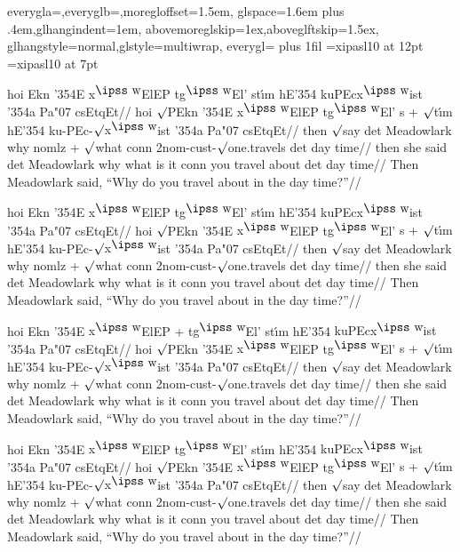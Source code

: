 
%
   {everygla=\ips,everyglb=\ips,moregloffset=1.5em,
   glspace=1.6em plus .4em,glhangindent=1em,
   abovemoreglskip=1ex,aboveglftskip=1.5ex,
   glhangstyle=normal,glstyle=multiwrap,
   everygl={\rightskip=0pt plus 1fil}}
\font\ips=xipasl10 at 12pt
\font\ipss=xipasl10 at 7pt
\def\mroot{$\surd$}
\def\L{\char'354}
\def\v#1{{\accent"07 #1}}
\def\C{{\accent"07 c}}
\def\W{$^{\hbox{\ipss w}}\mskip-2mu$}

\hsize=4in

\framedisplay
\ex[lingstyle=ips-gloss]
\begingl
\gla hoi Ekn {\L}E {x\W}ElEP t{g\W}El' st{\'\i}m
   {hE\L} {kuPEcx\W ist} {\L a} Pa{\v c}sEtqEt//
\glb hoi {\mroot}PEkn {\L}E {x\W}ElEP t{g\W}El' {s + \mroot t\'\i m}
   {hE\L} ku-PEc-\mroot{x\W}ist {\L}a Pa{\v c}sEtqEt//
\glc then {\mroot}say det Meadowlark why
      {nomlz + \mroot what} conn
   2nom-cust-{\mroot}one.travels det {day time}//
\glc then {she said} det Meadowlark why {what is it}
   conn {you travel about} det {day time}//
\glft Then Meadowlark said, ``Why do you travel about in the day
time?''//
\endgl
\xe
\endframedisplay

\hsize=5in
\framedisplay
\ex[lingstyle=ips-gloss]
\begingl
\gla hoi Ekn {\L}E {x\W}ElEP t{g\W}El' st{\'\i}m
   {hE\L} {kuPEcx\W ist} {\L a} Pa{\v c}sEtqEt//
\glb hoi {\mroot}PEkn {\L}E {x\W}ElEP t{g\W}El' {s + \mroot t\'\i m}
   {hE\L} ku-PEc-\mroot{x\W}ist {\L}a Pa{\v c}sEtqEt//
\glc then {\mroot}say det Meadowlark why
      {nomlz + \mroot what} conn
   2nom-cust-{\mroot}one.travels det {day time}//
\glc then {she said} det Meadowlark why {what is it}
   conn {you travel about} det {day time}//
\glft Then Meadowlark said, ``Why do you travel about in the day
time?''//
\endgl
\xe
\endframedisplay

\hsize=6.5in
\framedisplay
\ex[lingstyle=ips-gloss]
\begingl
\gla hoi Ekn {\L}E {x\W}ElEP + t{g\W}El' st{\'\i}m
   {hE\L} {kuPEcx\W ist} {\L a} Pa{\v c}sEtqEt//
\glb hoi {\mroot}PEkn {\L}E {x\W}ElEP t{g\W}El' {s + \mroot t\'\i m}
   {hE\L} ku-PEc-\mroot{x\W}ist {\L}a Pa{\v c}sEtqEt//
\glc then {\mroot}say det Meadowlark why
      {nomlz + \mroot what} conn
   2nom-cust-{\mroot}one.travels det {day time}//
\glc then {she said} det Meadowlark why {what is it}
   conn {you travel about} det {day time}//
\glft Then Meadowlark said, ``Why do you travel about in the day
time?''//
\endgl
\xe
\endframedisplay

\ex[lingstyle=ips-gloss,glhangstyle=cascade]
\begingl
\gla hoi Ekn {\L}E {x\W}ElEP t{g\W}El' st{\'\i}m
   {hE\L} {kuPEcx\W ist} {\L a} Pa{\v c}sEtqEt//
\glb hoi {\mroot}PEkn {\L}E {x\W}ElEP t{g\W}El' {s + \mroot t\'\i m}
   {hE\L} ku-PEc-\mroot{x\W}ist {\L}a Pa{\v c}sEtqEt//
\glc then {\mroot}say det Meadowlark why
      {nomlz + \mroot what} conn
   2nom-cust-{\mroot}one.travels det {day time}//
\glc then {she said} det Meadowlark why {what is it}
   conn {you travel about} det {day time}//
\glft Then Meadowlark said, ``Why do you travel about in the day
time?''//
\endgl
\xe

